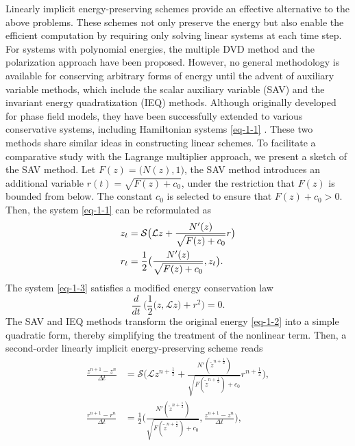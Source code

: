 \documentclass[onefignum,onetabnum]{siamart}
\begin{document}
Linearly implicit energy-preserving schemes provide an effective alternative to the above problems. These schemes not only preserve the energy but also enable the efficient computation by requiring only solving linear systems at each time step. For systems with polynomial energies, the multiple DVD method \cite{matsuo-01-DC-JCP} and the polarization approach \cite{dahlby-11-general-IP-SIAMJSC} have been proposed. However, no general methodology is available for conserving arbitrary forms of energy until the advent of auxiliary variable methods, which include the scalar auxiliary variable (SAV) \cite{shen-18-SAV-JCP} and the invariant energy quadratization (IEQ) \cite{yang-17-IEQ-JCP} methods. Although originally developed for phase field models, they have been successfully extended to various conservative systems, including Hamiltonian systems \eqref{eq-1-1} \cite{bo-22-EIEQ-MS,cai-20-linear-MS-JCP,hou-24-CF-CNLW-ANM,jiang-19-SG-IEQ-JSC,jiang-20-CH-SAV-JSC,zhang-20-RK-JCP}. These two methods share similar ideas in constructing linear schemes. To facilitate a comparative study with the Lagrange multiplier approach, we present a sketch of the SAV method. Let $F(z)=\big(N(z),1\big)$, the SAV method introduces an additional variable $r(t)=\sqrt{F(z)+c_0}$, under the restriction that $F(z)$ is bounded from below. The constant $c_0$ is selected to ensure that $F(z)+c_0>0$. Then, the system \eqref{eq-1-1} can be reformulated as
\begin{align}\label{eq-1-3}
	\aligned
	z_t&=\mathcal{S}\big(\mathcal{L}z+\frac{N'(z)}{\sqrt{F(z)+c_0}}r\big)\\
	r_t&=\frac{1}{2}\big(\frac{N'(z)}{\sqrt{F(z)+c_0}},z_t\big).
	\endaligned
\end{align}
The system \eqref{eq-1-3} satisfies a modified energy conservation law
\begin{equation}\label{eq-1-4}
	\frac{d}{dt}~\Big(\frac{1}{2}\big(z,\mathcal{L}z\big)+r^2\Big)=0.
\end{equation} 
The SAV and IEQ methods transform the original energy \eqref{eq-1-2} into a simple quadratic form, thereby simplifying the treatment of the nonlinear term. Then, a second-order linearly implicit energy-preserving scheme reads
\begin{equation}\label{eq-1-5}
	\begin{aligned}
			\frac{z^{n+1}-z^n}{\Delta t}&=\mathcal{S}\big(\mathcal{L}z^{n+\frac{1}{2}}+\frac{N'(\tilde{z}^{n+\frac{1}{2}})}{\sqrt{F(\tilde{z}^{n+\frac{1}{2}})+c_0}}r^{n+\frac{1}{2}}\big),\\
			\frac{r^{n+1}-r^n}{\Delta t}&=\frac{1}{2}\big(\frac{N'(\tilde{z}^{n+\frac{1}{2}})}{\sqrt{F(\tilde{z}^{n+\frac{1}{2}})+c_0}},\frac{z^{n+1}-z^n}{\Delta t}\big),
		\end{aligned}
\end{equation}
\end{document}

